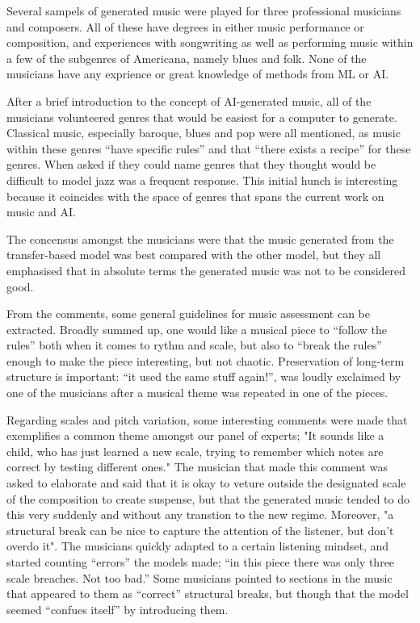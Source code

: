 \documentclass{IEEEtran}
\begin{document}
Several sampels of generated music were played for three
professional musicians and composers. All of these have degrees in
either music performance or composition, and experiences with 
songwriting as well as performing music within a few of the subgenres of 
Americana, namely blues and folk. None of the musicians have any 
exprience or great knowledge of methods from ML or AI.

After a brief introduction to the concept of AI-generated music,
all of the musicians 
volunteered genres that would be easiest for a computer to generate. 
Classical music, especially baroque, blues and pop were all mentioned, 
as music within these genres ``have specific rules'' and that 
``there exists a recipe'' for these genres. When asked if they could
name genres that 
they thought would be difficult to model jazz was a frequent response.
This initial hunch is interesting because 
it coincides with the space of genres that spans the current work on music 
and AI.

The concensus amongst the musicians were that the music generated from 
the transfer-based model was best compared with the other model, but they
all emphasised that in absolute terms the generated music was not to be 
considered good.

From the comments, some general guidelines for music assessment can be 
extracted. Broadly summed up, one would like a musical piece to
``follow the rules'' both when it comes to rythm and scale, but also to 
``break the rules'' enough to make the piece interesting, but not 
chaotic. Preservation of long-term structure is important:
``it used the same stuff again!'', was loudly exclaimed 
by one of the musicians after a musical theme was repeated in one of the 
pieces.

Regarding scales and pitch variation, some interesting comments were 
made that exemplifies a common theme amongst our panel of experts;
"It sounds like a child, who has just learned a new scale, trying 
to remember which notes are correct by testing different ones." 
The musician that made this comment was asked to elaborate and 
said that it is okay to veture outside the designated scale of the 
composition to create suspense, but that the generated music tended 
to do this very suddenly and without any transtion to the new 
regime. Moreover, "a structural break
can be nice to capture the attention of the listener, but don't overdo
it". The musicians quickly adapted to a certain listening mindset, and
started counting ``errors'' the models made; ``in this piece there was 
only three scale breaches. Not too bad.'' Some musicians pointed to sections 
in the music that appeared to them as ``correct'' structural breaks, but 
though that the model seemed ``confues itself'' by introducing them.
\end{document}
